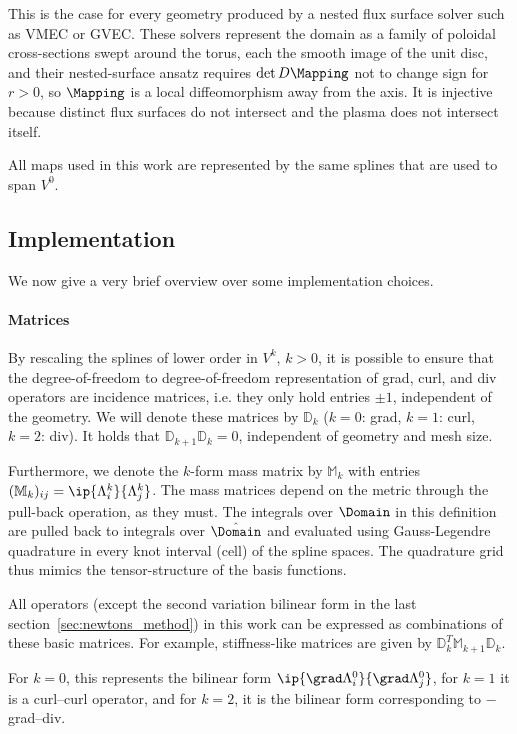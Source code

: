 \documentclass[%
 reprint,
 superscriptaddress,
 amsmath,amssymb,
 aps, nofootinbib, floatfix]{revtex4-2}
\begin{document}
This is the case for every geometry produced by a nested flux surface solver such as VMEC or GVEC. These solvers represent the domain as a family of poloidal cross-sections swept around the torus, each the smooth image of the unit disc, and their nested-surface ansatz requires $\det D\Mapping$ not to change sign for $r > 0$, so $\Mapping$ is a local diffeomorphism away from the axis. It is injective because distinct flux surfaces do not intersect and the plasma does not intersect itself.

All maps used in this work are represented by the same splines that are used to span $V^0$.

\subsection{Implementation}
\label{sec:implementation}
We now give a very brief overview over some implementation choices.
\paragraph{Matrices}
By rescaling the splines of lower order in $V^k$, $k>0$, it is possible to ensure that the degree-of-freedom to degree-of-freedom representation of grad, curl, and div operators are incidence matrices, i.e. they only hold entries $\pm 1$, independent of the geometry. We will denote these matrices by $\mathbb D_k$ ($k=0$: grad, $k=1$: curl, $k=2$: div). It holds that $\mathbb D_{k+1} \mathbb D_k = 0$, independent of geometry and mesh size.

Furthermore, we denote the $k$-form mass matrix by $\mathbb M_k$ with entries $(\mathbb M_k)_{ij} = \ip{\Lambda^k_i}{\Lambda^k_j}$. The mass matrices depend on the metric through the pull-back operation, as they must. The integrals over $\Domain$ in this definition are pulled back to integrals over $\hat \Domain$ and evaluated using Gauss-Legendre quadrature in every knot interval (cell) of the spline spaces. The quadrature grid thus mimics the tensor-structure of the basis functions.

All operators (except the second variation bilinear form in the last section~\ref{sec:newtons_method}) in this work can be expressed as combinations of these basic matrices. For example, stiffness-like matrices are given by $\mathbb D_k^T \mathbb M_{k+1} \mathbb D_k$.

For $k=0$, this represents the bilinear form $\ip{\grad \Lambda^0_i}{\grad \Lambda^0_j}$, for $k=1$ it is a curl--curl operator, and for $k=2$, it is the bilinear form corresponding to $-$grad--div.
\end{document}

